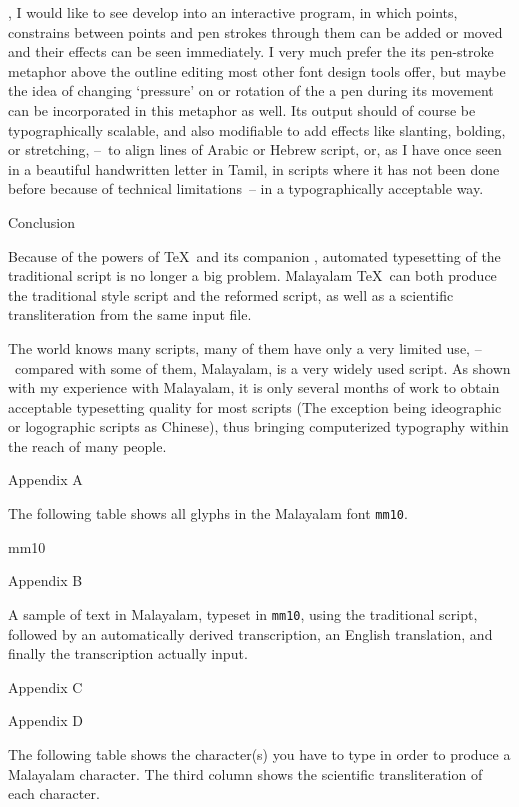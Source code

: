 \MF, I would like to see develop into an interactive program, in which
points, constrains between points and pen strokes through them can be
added or moved and their effects can be seen immediately. I very much
prefer the its pen-stroke metaphor above the outline editing most
other font design tools offer, but maybe the idea of changing
`pressure' on or rotation of the a pen during its movement can be
incorporated in this metaphor as well. Its output should of course be
typographically scalable, and also modifiable to add effects like
slanting, bolding, or stretching, --~to align lines of
Arabic or Hebrew script, or, as I have once seen in a beautiful
handwritten letter in Tamil, in scripts where it has not been done
before because of technical limitations~-- in a typographically
acceptable way.

\beginsection Conclusion

Because of the powers of \TeX\ and its companion \MF, automated
typesetting of the traditional script is no longer a big problem.
Malayalam \TeX\ can both produce the traditional style script and the
reformed script, as well as a scientific transliteration from the same
input file.

The world knows many scripts, many of them have only a very limited
use, --~compared with some of them, Malayalam, is a very widely used
script. As shown with my experience with Malayalam, it is only several
months of work to obtain acceptable typesetting quality for most
scripts (The exception being ideographic or logographic scripts as
Chinese), thus bringing computerized typography within the reach of
many people.

\beginsection Appendix A

The following table shows all glyphs in the Malayalam font {\tt mm10}.
\bigskip

\table mm10

\beginsection Appendix B

A sample of text in Malayalam, typeset in {\tt mm10}, using the
traditional script, followed by an automatically derived transcription,
an English translation, and finally the transcription actually input.
\bigskip


\beginsection Appendix C



\beginsection Appendix D

The following table shows the character(s) you have to type in order
to produce a Malayalam character. The third column shows the
scientific transliteration of each character.
\bigskip


\bye
